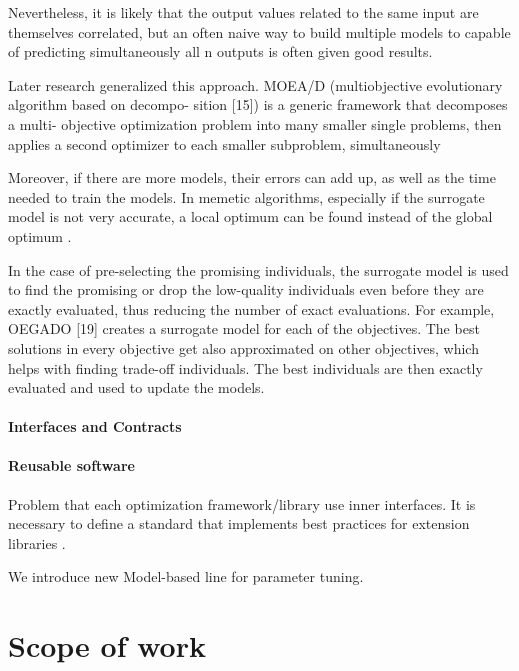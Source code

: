         Nevertheless, it is likely that the output values related to the same input are themselves correlated, 
        but an often naive way to build multiple models to capable of predicting simultaneously all n outputs is often given good results. 


        Later research generalized this approach. MOEA/D (multiobjective evolutionary algorithm based on decompo- sition [15]) is a 
        generic framework that decomposes a multi- objective optimization problem into many smaller single problems, 
        then applies a second optimizer to each smaller subproblem, simultaneously

        Moreover, if there are more models, their errors can add up, as well as the time needed to train the models. 
        In memetic algorithms, especially if the surrogate model is not very accurate, a local optimum can be found 
        instead of the global optimum \cite{MlakarPTF15}.


        In the case of pre-selecting the promising individuals, the surrogate model is used to find the promising 
        or drop the low-quality individuals even before they are exactly evaluated, thus reducing the number of 
        exact evaluations. For example, OEGADO [19] creates a surrogate model for each of the objectives. 
        The best solutions in every objective get also approximated on other objectives, which helps with 
        finding trade-off individuals. The best individuals are then exactly evaluated and used to update the models.


        \paragraph{Interfaces and Contracts}


        \paragraph{Reusable software}
        Problem that each optimization framework/library use inner interfaces. 
        It is necessary to define a standard that implements best practices for extension libraries \cite{buitinck2013api}.

        We introduce new Model-based line for parameter tuning. 


    \section{Scope of work}

